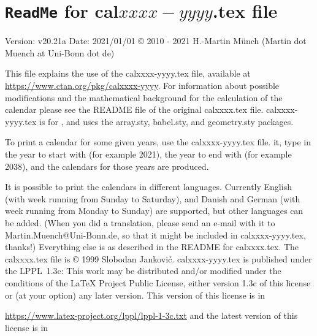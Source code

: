 \documentclass{article}
\begin{document}
\section*{\texttt{ReadMe} for cal$xxxx-yyyy$.tex file}
Version: v20.21a\newline
Date: 2021/01/01\newline
\copyright{} 2010 - 2021 H.-Martin M\"{u}nch (Martin dot Muench at Uni-Bonn dot de)\newline

\noindent This file explains the use of the \textsf{calxxxx-yyyy.tex} file,
available at\newline
\url{https://www.ctan.org/pkg/calxxxx-yyyy}.\newline
\noindent For information about possible modifications and the mathematical background
for the calculation of the calendar please see the README file of the original
\textsf{calxxxx.tex} file. \textsf{calxxxx-yyyy.tex} is for \LaTeXe, and uses
the \textsf{array.sty}, \textsf{babel.sty}, and \textsf{geometry.sty} packages.

\hspace*{-1.98471pt}To print a calendar for some given years,
use the \textsf{calxxxx-yyyy.tex} file. \LaTeXe{} it, type in the year to start with
(for example 2021), the year to end with (for example 2038), and the calendars
for those years are produced.

It is possible to print the calendars in different languages. Currently
English (with week running from Sunday to Saturday),
and Danish and German (with week running from Monday to Sunday) are supported,
but other languages can be added. (When you did a translation, please send
an e-mail with it to {\nolinebreak Martin.Muench@Uni-Bonn.de,}
so that it might be included in \textsf{calxxxx-yyyy.tex}, thanks!)\newline
Everything else is as described in the README for \textsf{calxxxx.tex}.\newline
The \textsf{calxxxx.tex} file is \copyright{} 1999 Slobodan Jankovi\'{c}.\newline
\textsf{calxxxx-yyyy.tex} is published under the LPPL~1.3c: This work may be
distributed and/or modified under the conditions of the \LaTeX{} Project
Public License, either version 1.3c of this license or (at your option) any
later version. This version of this license is in

\url{https://www.latex-project.org/lppl/lppl-1-3c.txt}\newline
and the latest version of this license is in
\end{document}
